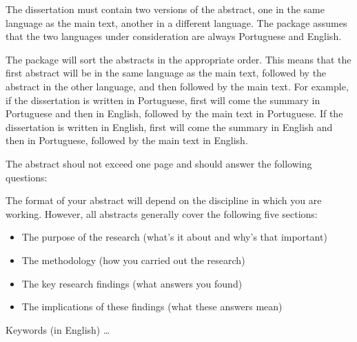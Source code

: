 The dissertation must contain two versions of the abstract, one in the same language as the main text, another in a different language.  The package assumes that the two languages under consideration are always Portuguese and English.

The package will sort the abstracts in the appropriate order. This means that the first abstract will be in the same language as the main text, followed by the abstract in the other language, and then followed by the main text. For example, if the dissertation is written in Portuguese, first will come the summary in Portuguese and then in English, followed by the main text in Portuguese. If the dissertation is written in English, first will come the summary in English and then in Portuguese, followed by the main text in English.

The abstract shoul not exceed one page and should answer the following questions:

The format of your abstract will depend on the discipline in which you are working. However, all abstracts generally cover the following five sections:
\begin{itemize}
	\item The purpose of the research (what’s it about and why’s that important)
	\item The methodology (how you carried out the research)
	\item The key research findings (what answers you found)
	\item The implications of these findings (what these answers mean)
\end{itemize}

\begin{keywords}
Keywords (in English) \ldots
\end{keywords} 
